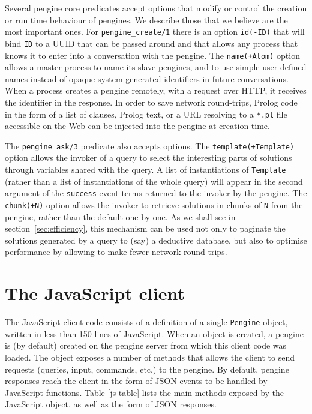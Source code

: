 \documentclass{new_tlp}
\newcommand{\secref}[1]{section~\ref{sec:#1}}
\begin{document}
Several pengine core predicates accept options that modify or control the
creation or run time behaviour of pengines. We describe those that we
believe are the most important ones. For \texttt{pengine\_create/1}
there is an option \texttt{id(-ID)} that will bind \texttt{ID} to a
UUID that can be passed around and
that allows any process that knows it to enter into a conversation with
the pengine. The \texttt{name(+Atom)} option allows a master process to
name its slave pengines, and to use simple user defined names instead of
opaque system generated identifiers in future conversations. When a
process creates a pengine remotely, with a request over HTTP, it
receives the identifier in the response. In order to save network
round-trips, Prolog code in the form of a list of clauses, Prolog text,
or a URL resolving to a \texttt{*.pl} file accessible on the Web can be
injected into the pengine at creation time.

The \texttt{pengine\_ask/3} predicate also accepts options. The
\texttt{template(+Template)} option allows the invoker of a query to
select the interesting parts of solutions through variables shared with
the query. A list of instantiations of \texttt{Template} (rather than a
list of instantiations of the whole query) will appear in the second
argument of the \texttt{success} event terms returned to the invoker by
the pengine. The \texttt{chunk(+N)} option allows the invoker to
retrieve solutions in chunks of \texttt{N} from the pengine, rather than
the default one by one. As we shall see in \secref{efficiency}, this
mechanism can be used not only to paginate the solutions generated by a
query to (say) a deductive database, but also to optimise performance by
allowing  to make fewer network round-trips.


\section{The JavaScript client}

The JavaScript client code consists of a definition of a single
\texttt{Pengine} object, written in less than 150 lines of JavaScript.
When an object is created, a pengine is (by default) created on the
pengine server from which this client code was loaded. The object
exposes a number of methods that allows the client to send requests
(queries, input, commands, etc.) to the pengine. By default, pengine
responses reach the client in the form of JSON events to be handled by
JavaScript functions. Table \ref{js-table} lists the main methods
exposed by the JavaScript object, as well as the form of JSON responses.
\end{document}
